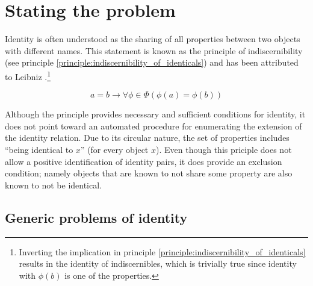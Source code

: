 \section{Stating the problem}
\label{sec:stating_the_problem}

Identity is often understood as the sharing of all properties between
  two objects with different names. 
This statement is known as the principle of indiscernibility
  (see principle \ref{principle:indiscernibility_of_identicals})
  and has been attributed to Leibniz \cite{Forrest2010}.\footnote{
    Inverting the implication in
      principle \ref{principle:indiscernibility_of_identicals}
      results in the identity of indiscernibles,
      which is trivially true since identity with $\phi(b)$
      is one of the properties.
    }

\begin{principle}
\label{principle:indiscernibility_of_identicals}
\begin{equation}
    a = b
  \rightarrow
    \forall \phi \in \Phi (\phi(a) = \phi(b)\nonumber)
\end{equation}
\end{principle}

\noindent Although the principle provides necessary and sufficient conditions
  for identity, it does not point toward an automated procedure
  for enumerating the extension of the identity relation.
Due to its circular nature, the set of properties includes
  ``being identical to $x$'' (for every object $x$).
Even though this priciple does not
  allow a positive identification of identity pairs,
  it does provide an exclusion condition;
  namely objects that are known to not share some property
  are also known to not be identical.

\subsection{Generic problems of identity}

